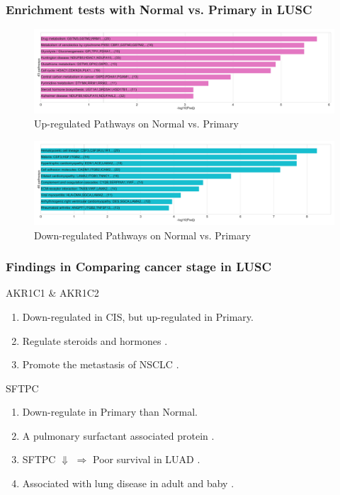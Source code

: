 \documentclass{beamer}
\begin{document}
    \begin{frame}
        \frametitle{Enrichment tests with Normal vs. Primary in LUSC}

        \begin{figure}
            \includegraphics[width=0.8 \linewidth]{figures/DEG/Enrichment/STAR.FPKM.SQC.Normal-Primary.Up.KEGG.pdf}
            \caption{Up-regulated Pathways on Normal vs. Primary}
        \end{figure}

        \begin{figure}
            \includegraphics[width=0.8 \linewidth]{figures/DEG/Enrichment/STAR.FPKM.SQC.Normal-Primary.Down.KEGG.pdf}
            \caption{Down-regulated Pathways on Normal vs. Primary}
        \end{figure}
    \end{frame}

    \begin{frame}
        \frametitle{Findings in Comparing cancer stage in LUSC}

        \begin{block}{AKR1C1 \& AKR1C2}
            \begin{enumerate}
                \item Down-regulated in CIS, but up-regulated in Primary.
                \item Regulate steroids \cite{AKR1C1-1} and hormones \cite{AKR1C1-2}.
                \item Promote the metastasis of NSCLC \cite{AKR1C1-3}.
            \end{enumerate}
        \end{block}

        \begin{block}{SFTPC}
            \begin{enumerate}
                \item Down-regulate in Primary than Normal.
                \item A pulmonary surfactant associated protein \cite{SFTPC4}.
                \item SFTPC $\Downarrow$ $\Rightarrow$ Poor survival in LUAD \cite{SFTPC1}.
                \item Associated with lung disease in adult \cite{SFTPC2} and baby \cite{SFTPC3}.
            \end{enumerate}
        \end{block}
    \end{frame}
\end{document}
